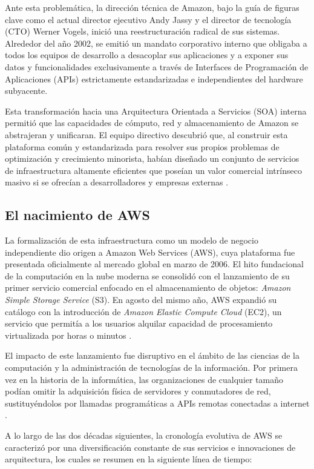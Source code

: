 \documentclass[12pt,a4paper]{article}
\begin{document}
Ante esta problemática, la dirección técnica de Amazon, bajo la guía de figuras clave como el actual director ejecutivo Andy Jassy y el director de tecnología (CTO) Werner Vogels, inició una reestructuración radical de sus sistemas. Alrededor del año 2002, se emitió un mandato corporativo interno que obligaba a todos los equipos de desarrollo a desacoplar sus aplicaciones y a exponer sus datos y funcionalidades exclusivamente a través de Interfaces de Programación de Aplicaciones (APIs) estrictamente estandarizadas e independientes del hardware subyacente.

Esta transformación hacia una Arquitectura Orientada a Servicios (SOA) interna permitió que las capacidades de cómputo, red y almacenamiento de Amazon se abstrajeran y unificaran. El equipo directivo descubrió que, al construir esta plataforma común y estandarizada para resolver sus propios problemas de optimización y crecimiento minorista, habían diseñado un conjunto de servicios de infraestructura altamente eficientes que poseían un valor comercial intrínseco masivo si se ofrecían a desarrolladores y empresas externas \parencite{awsWhatIs}.
\subsection{El nacimiento de AWS}
La formalización de esta infraestructura como un modelo de negocio independiente dio origen a Amazon Web Services (AWS), cuya plataforma fue presentada oficialmente al mercado global en marzo de 2006. El hito fundacional de la computación en la nube moderna se consolidó con el lanzamiento de su primer servicio comercial enfocado en el almacenamiento de objetos: \textit{Amazon Simple Storage Service} (S3). En agosto del mismo año, AWS expandió su catálogo con la introducción de \textit{Amazon Elastic Compute Cloud} (EC2), un servicio que permitía a los usuarios alquilar capacidad de procesamiento virtualizada por horas o minutos \parencite{awsWhatIs}.

El impacto de este lanzamiento fue disruptivo en el ámbito de las ciencias de la computación y la administración de tecnologías de la información. Por primera vez en la historia de la informática, las organizaciones de cualquier tamaño podían omitir la adquisición física de servidores y conmutadores de red, sustituyéndolos por llamadas programáticas a APIs remotas conectadas a internet \parencite{armbrust2010}.

A lo largo de las dos décadas siguientes, la cronología evolutiva de AWS se caracterizó por una diversificación constante de sus servicios e innovaciones de arquitectura, los cuales se resumen en la siguiente línea de tiempo:
\end{document}
